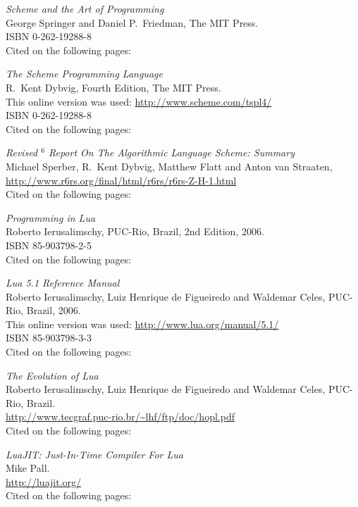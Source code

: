 \begin{thebibliography}{9}

  \emph{Scheme and the Art of Programming} \\
  George Springer and Daniel P.\ Friedman,
  The MIT Press. \\
  ISBN 0-262-19288-8 \\
  Cited on the following pages: 

  \emph{The Scheme Programming Language} \\
  R.\ Kent Dybvig,
  Fourth Edition,
  The MIT Press. \\
  This online version was used: \url{http://www.scheme.com/tspl4/} \\
  ISBN 0-262-19288-8 \\
  Cited on the following pages: 

  \emph{Revised $^6$ Report On The Algorithmic Language Scheme: Summary} \\
  Michael Sperber, R.\ Kent Dybvig, Matthew Flatt and Anton van Straaten, \\
  \url{http://www.r6rs.org/final/html/r6rs/r6rs-Z-H-1.html} \\
  Cited on the following pages: 

  \emph{Programming in Lua} \\
  Roberto Ierusalimschy,
  PUC-Rio, Brazil,
  2nd Edition,
  2006. \\
  ISBN 85-903798-2-5 \\
  Cited on the following pages: 
  
  \emph{Lua 5.1 Reference Manual} \\
  Roberto Ierusalimschy, Luiz Henrique de Figueiredo and Waldemar Celes,
  PUC-Rio, Brazil,
  2006. \\
  This online version was used: \url{http://www.lua.org/manual/5.1/} \\
  ISBN 85-903798-3-3 \\
  Cited on the following pages: 
  
  \emph{The Evolution of Lua} \\
  Roberto Ierusalimschy, Luiz Henrique de Figueiredo and Waldemar Celes,
  PUC-Rio, Brazil. \\
  \url{http://www.tecgraf.puc-rio.br/~lhf/ftp/doc/hopl.pdf} \\
  Cited on the following pages: 
  
  \emph{LuaJIT: Just-In-Time Compiler For Lua} \\
  Mike Pall. \\
  \url{http://luajit.org/} \\
  Cited on the following pages:


\end{thebibliography}
